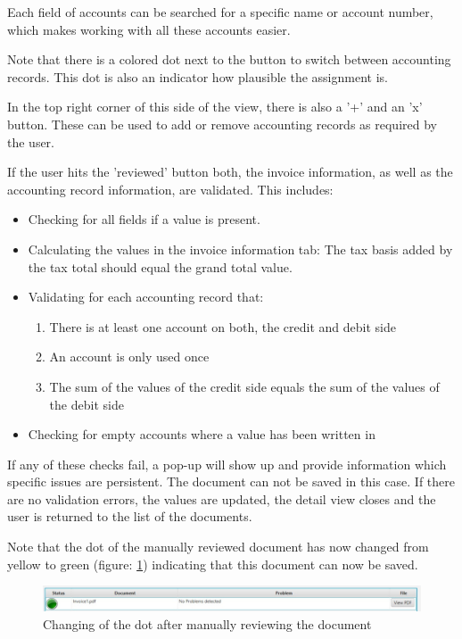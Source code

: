 Each field of accounts can be searched for a specific name or account number, which makes working with all these accounts easier.

Note that there is a colored dot next to the button to switch between accounting records. This dot is also an indicator how plausible the assignment is. 

In the top right corner of this side of the view, there is also a '+' and an 'x' button. These can be used to add or remove accounting records as required by the user.

If the user hits the 'reviewed' button both, the invoice information, as well as the accounting record information, are validated. This includes:
\begin{itemize}
	\item Checking for all fields if a value is present.
	\item Calculating the values in the invoice information tab: The tax basis added by the tax total should equal the grand total value.
	\item Validating for each accounting record that:
		\begin{enumerate}
			\item There is at least one account on both, the credit and debit side
			\item An account is only used once
			\item The sum of the values of the credit side equals the sum of the values of the debit side
		\end{enumerate}
	\item Checking for empty accounts where a value has been written in
\end{itemize}

If any of these checks fail, a pop-up will show up and provide information which specific issues are persistent. The document can not be saved in this case. If there are no validation errors, the values are updated, the detail view closes and the user is returned to the list of the documents.

Note that the dot of the manually reviewed document has now changed from yellow to green (figure: \ref{greenAfterReview}) indicating that this document can now be saved.

\begin{figure}[ht!]
\centering
\includegraphics[width=\textwidth,natwidth=377,natheight=26]{Images/GUI/greenAfterReview1.pdf}
\caption{Changing of the dot after manually reviewing the document \label{greenAfterReview}}
\end{figure}

